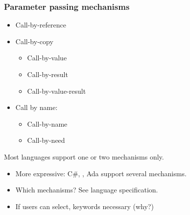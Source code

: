 \documentclass{beamer}
\begin{document}
\begin{frame}[fragile]
\frametitle{Parameter passing mechanisms}
\begin{itemize}
\item Call-by-reference
\item Call-by-copy
\begin{itemize}
\item Call-by-value
\item Call-by-result
\item Call-by-value-result
\end{itemize}

\item Call by name: 

\begin{itemize}
\item Call-by-name
\item Call-by-need
\end{itemize}
\end{itemize}

Most languages support one or two mechanisms only. 
\begin{itemize}
\item More expressive:  C\#, \Cpp, Ada support several mechanisms.
\item Which mechanisms? See language specification. 
\item If users can select, keywords necessary (why?) 
\end{itemize}



\end{frame}
\end{document}
